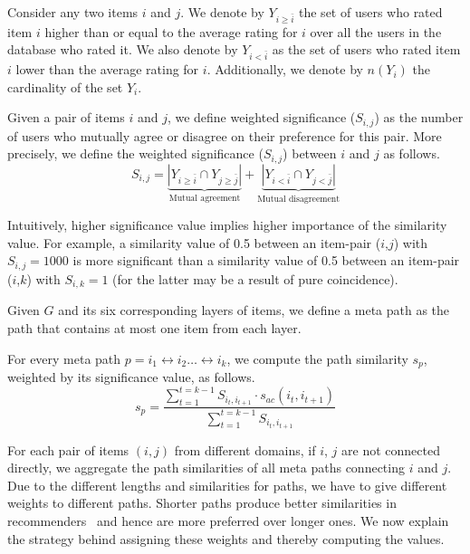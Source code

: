  Consider any two items $i$ and $j$. We denote by $Y_{i \geq \bar{i}}$ the set of users who rated item $i$ higher than or equal to the average rating for $i$ over all the users in the database who rated it. We also denote by $Y_{i < \bar{i}}$ as the set of users who rated item $i$ lower than the average rating for $i$. Additionally, we denote by $n(Y_i)$ the cardinality of the set $Y_i$. 

\begin{definition}
Given a pair of items $i$ and $j$, we define weighted significance ($S_{i,j}$) as the number of users who mutually agree or disagree on their preference for this pair. More precisely, we define the weighted significance ($S_{i,j}$) between $i$ and $j$ as follows.
$$
S_{i,j}= \underbrace{\left\vert{Y_{i \geq \bar{i}} \cap Y_{j \geq \bar{j}}}\right\vert}_\text{Mutual agreement} + \underbrace{\left\vert{Y_{i < \bar{i}} \cap Y_{j < \bar{j}}}\right\vert}_\text{Mutual disagreement}
$$
\end{definition}
Intuitively, higher significance value implies higher importance of the similarity value. For example, a similarity value of 0.5 between an item-pair ($i$,$j$) with $S_{i,j}=1000$ is more significant than a similarity value of 0.5 between an item-pair ($i$,$k$) with $S_{i,k}=1$ (for the latter may be a result of pure coincidence).

\begin{definition}
Given $G$ and its six corresponding layers of items, we define a meta path as the path that contains at most one item from each layer.
\end{definition}
For every meta path $p = i_1 \leftrightarrow i_2 \ldots \leftrightarrow i_k$, we compute the path similarity $s_p$, weighted by its significance value, as follows.
\[ s_p = \frac{\sum_{t=1}^{t=k-1} S_{i_{t},i_{t+1}} \cdot s_{a c} (i_{t}, i_{t+1})}{\sum_{t=1}^{t=k-1}  S_{i_{t},i_{t+1}}}  \]

For each pair of items $(i, j)$ from different domains, if $i$, $j$ are not connected directly, we aggregate the path similarities of all meta paths connecting $i$ and $j$. Due to the different lengths and similarities for paths, we have to give different weights to different paths. Shorter paths produce better similarities in recommenders~\cite{ramakrishnan2001privacy,sun2011pathsim} and hence are more preferred over longer ones. We now explain the strategy behind assigning these weights and thereby computing the \graphsim values.

